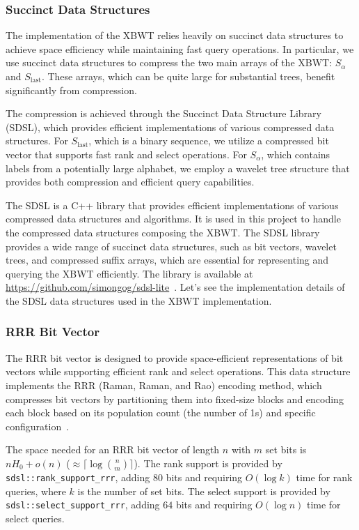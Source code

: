 \subsubsection{Succinct Data Structures}
The implementation of the XBWT relies heavily on succinct data structures to achieve space efficiency while maintaining fast query operations. In particular, we use succinct data structures to compress the two main arrays of the XBWT: $S_\alpha$ and $S_{\text{last}}$. These arrays, which can be quite large for substantial trees, benefit significantly from compression.

The compression is achieved through the Succinct Data Structure Library (SDSL), which provides efficient implementations of various compressed data structures. For $S_{\text{last}}$, which is a binary sequence, we utilize a compressed bit vector that supports fast rank and select operations. For $S_\alpha$, which contains labels from a potentially large alphabet, we employ a wavelet tree structure that provides both compression and efficient query capabilities.

The SDSL is a C++ library that provides efficient implementations of various compressed data structures and algorithms. It is used in this project to handle the compressed data structures composing the XBWT. The SDSL library provides a wide range of succinct data structures, such as bit vectors, wavelet trees, and compressed suffix arrays, which are essential for representing and querying the XBWT efficiently. The library is available at \url{https://github.com/simongog/sdsl-lite}~\cite{gbmp2014sea}. Let's see the implementation details of the SDSL data structures used in the XBWT implementation.

\subsubsection{RRR Bit Vector}
The RRR bit vector is designed to provide space-efficient representations of bit vectors while supporting efficient rank and select operations. This data structure implements the RRR (Raman, Raman, and Rao) encoding method, which compresses bit vectors by partitioning them into fixed-size blocks and encoding each block based on its population count (the number of 1s) and specific configuration~\cite{raman2002succinct}. 

The space needed for an RRR bit vector of length $n$ with $m$ set bits is $nH_0 + o(n)$ ($\approx \lceil \log \binom{n}{m} \rceil$). 
The rank support is provided by \texttt{sdsl::rank\_support\_rrr}, adding $80$ bits and requiring $O(\log k)$ time for rank queries, where $k$ is the number of set bits. The select support is provided by \texttt{sdsl::select\_support\_rrr}, adding $64$ bits and requiring $O(\log n)$ time for select queries.

